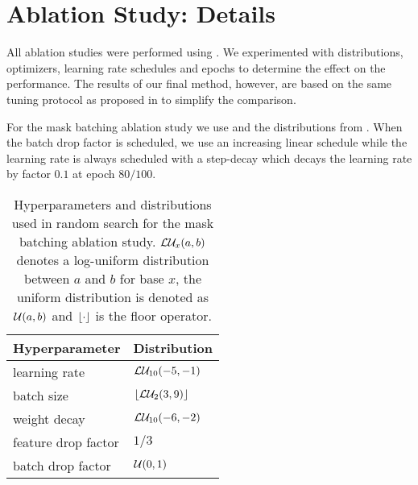 
\chapter{Ablation Study: Details} %
\label{sec:abl-distr} %
All ablation studies were performed using \domainbed \citep{gulrajani2020search}. We experimented with distributions, optimizers, learning rate schedules and epochs to determine the effect on the performance. The results of our final method, however, are based on the same tuning protocol as proposed in \domainbed to simplify the comparison.

For the mask batching ablation study we use \adam \citep{Kingma2015} and the distributions from . When the batch drop factor is scheduled, we use an increasing linear schedule while the learning rate is always scheduled with a step-decay which decays the learning rate by factor $0.1$ at epoch $80/100$.
\begin{table}[!htbp]
    \centering
    \begin{tabular}{ll}
        \toprule
        \textbf{Hyperparameter} & \textbf{Distribution} \\
        \midrule
        learning rate & $\loguni{-5}{-1}$ \\
        batch size  & $\floor*{\logunitwo{3}{9}}$ \\
        weight decay  & $\loguni{-6}{-2}$ \\
        feature drop factor  & $1/3$ \\
        batch drop factor  & $\uni{0}{1}$ \\
         \bottomrule 
    \end{tabular}
    \caption[Hyperparameters and distributions used in random search for the mask batching ablation study]{Hyperparameters and distributions used in random search for the mask batching ablation study. $\logunix{a}{b}$ denotes a log-uniform distribution between $a$ and $b$ for base $x$, the uniform distribution is denoted as $\uni{a}{b}$ and $\floor*{\cdot}$ is the floor operator.}
    \label{tab:abl-distributions-mask-batching}
\end{table}

